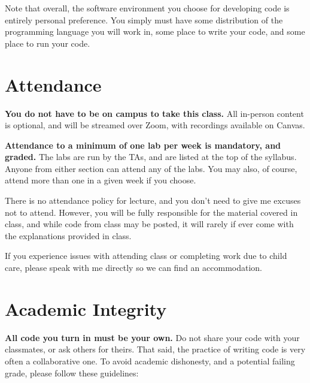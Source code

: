 \documentclass{article}
\begin{document}
Note that overall, the software environment you choose for developing code is entirely personal preference.  You simply must have some distribution of the programming language you will work in, some place to write your code, and some place to run your code.
	
\section*{Attendance}
\textbf{You do not have to be on campus to take this class.}  All in-person content is optional, and will be streamed over Zoom, with recordings available on Canvas.

\textbf{Attendance to a minimum of one lab per week is mandatory, and graded.}  The labs are run by the TAs, and are listed at the top of the syllabus.  Anyone from either section can attend any of the labs.  You may also, of course, attend more than one in a given week if you choose.

There is no attendance policy for lecture, and you don't need to give me excuses not to attend.  However, you will be fully responsible for the material covered in class, and while code from class may be posted, it will rarely if ever come with the explanations provided in class.

If you experience issues with attending class or completing work due to child care, please speak with me directly so we can find an accommodation.

\section*{Academic Integrity}
\textbf{All code you turn in must be your own.}  Do not share your code with your classmates, or ask others for theirs.  That said, the practice of writing code is very often a collaborative one.  To avoid academic dishonesty, and a potential failing grade, please follow these guidelines:
\end{document}
